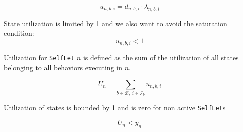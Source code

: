 \documentclass[11pt]{amsart}
\newcommand{\slet}{\texttt{SelfLet}}
\newcommand{\moreslet}{\texttt{SelfLet}s}
\begin{document}
$$
	u_{n, b, i} = d_{n, b, i} \cdot \lambda_{n,b,i}
$$

State utilization is limited by 1 and we also want to avoid the saturation condition:
$$
	u_{n, b, i} < 1
$$


Utilization for \slet{} $n$ is defined as the sum of the utilization of all states belonging to all behaviors executing in $n$.

$$
	U_{n} = \sum_{b \in \mathcal{B}, \; i \in \mathcal{I}_b} u_{n, b, i}
$$

Utilization of states is bounded by 1 and is zero for non active \moreslet{}

$$
	U_{n} < y_n
$$

\begin{comment}
Some of the services' implementations do not involve other services (i.e., the computation is fully completed in that state). We call these states \emph{ability} states. The following variables denotes states (i.e., services) that are locally executed and do not involve other service invocations.

$$
x_{n,i} = \left\{
	\begin{array}{rl}
	1 & \mbox{if state $i$ is locally executed as ability in \slet{} $n$} \\
	0 & \mbox{otherwise} 
	\end{array} \right.
$$

Binary variables for service execution:

$$
w_{n,i} = \left\{ 
	\begin{array}{rl}
	1 & \mbox{if state $i$ is remotely executed from \slet{} $n$} \\
	0 & \mbox{otherwise} 
	\end{array} \right.
$$

$$
\tilde{w}_{n,i,m} = \left\{ 
	\begin{array}{rl}
	1 & \mbox{if state $i$ is remotely executed from \slet{} $n$ to \slet{} $m$} \\
	0 & \mbox{otherwise} 
	\end{array} \right.
$$

There are two different demand values depending on where the service is executed. 

$$D^s = \left\{ 
	\begin{array}{rl}
	DL^s & \mbox{local execution} \\
	DR^s & \mbox{remote execution} 
	\end{array} \right.
$$


Demand for state $i$ in \slet{} $n$ is given by the following equation:
$$
D_{n,i} = DL^{i} \cdot x_{n,i} + DR^{i} \cdot w_{n,i}
$$
where $\sum_{n}\sum_{i} x_{n,i} + w_{n,i} \leq 1$.


\end{comment}
\end{document}
